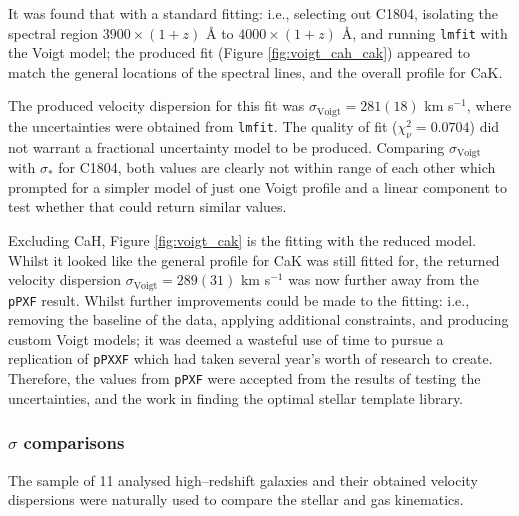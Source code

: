 \documentclass[12pt, twocolumn, nofootinbib]{revtex4-1}    %
\begin{document}
It was found that with a standard fitting: i.e., selecting out C1804, isolating the spectral region $3900\times(1+z)$ {\AA} to $4000\times(1+z)$ {\AA}, and running \texttt{lmfit} with the Voigt model; the produced fit (Figure \ref{fig:voigt_cah_cak}) appeared to match the general locations of the spectral lines, and the overall profile for CaK. 

The produced velocity dispersion for this fit was $\sigma_{\text{Voigt}}=281(18)$ km s$^{-1}$, where the uncertainties were obtained from \texttt{lmfit}. The quality of fit ($\chi^2_\nu=0.0704$) did not warrant a fractional uncertainty model to be produced. Comparing $\sigma_\text{Voigt}$ with $\sigma_*$ for C1804, both values are clearly not within range of each other which prompted for a simpler model of just one Voigt profile and a linear component to test whether that could return similar values.

Excluding CaH, Figure \ref{fig:voigt_cak} is the fitting with the reduced model. Whilst it looked like the general profile for CaK was still fitted for, the returned velocity dispersion $\sigma_{\text{Voigt}}=289(31)$ km s$^{-1}$ was now further away from the \texttt{pPXF} result. Whilst further improvements could be made to the fitting: i.e., removing the baseline of the data, applying additional constraints, and producing custom Voigt models; it was deemed a wasteful use of time to pursue a replication of \texttt{pPXXF} which had taken several year's worth of research to create. Therefore, the values from \texttt{pPXF} were accepted from the results of testing the uncertainties, and the work in finding the optimal stellar template library. 

\vspace{2ex} %
\subsubsection{$\sigma$ comparisons}
\noindent
The sample of 11 analysed high--redshift galaxies and their obtained velocity dispersions were naturally used to compare the stellar and gas kinematics. 
\end{document}
